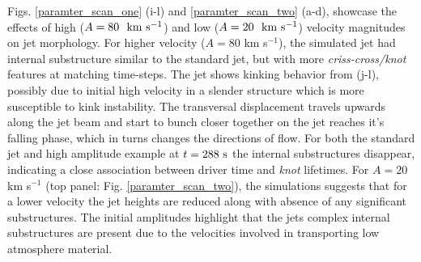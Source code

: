 \documentclass[12pt]{ociamthesis}
\newcommand{\fref}[1]{Fig. \eqref{#1}}
\newcommand{\kms}{~\rm{km ~s^{-1}}}
\newcommand{\np}{\\ \\}
\begin{document}
%
Figs. \ref{paramter_scan_one} (i-l) and \ref{paramter_scan_two} (a-d), showcase the effects of high ($A = 80 ~\kms$) and low ($A = 20 ~\kms$) velocity magnitudes on jet morphology. For higher velocity ($A = 80$ km s$^{-1}$), the simulated jet had internal substructure similar to the standard jet, but with more \textit{criss-cross/knot} features at matching time-steps. The jet shows kinking behavior from (j-l), possibly due to initial high velocity in a slender structure which is more susceptible to kink instability. The transversal displacement travels upwards along the jet beam and start to bunch closer together on the jet reaches it's falling phase, which in turns changes the directions of flow. For both the standard jet and high amplitude example at $t = 288 ~\rm{s}$ the internal substructures disappear, indicating a close association between driver time and \textit{knot} lifetimes. For $A = 20$ km s$^{-1}$ (top panel: \fref{paramter_scan_two}), the simulations suggests that for a lower velocity the jet heights are reduced along with absence of any significant substructures. The initial amplitudes highlight that the jets complex internal substructures are present due to the velocities involved in transporting low atmosphere material. \np
\end{document}
